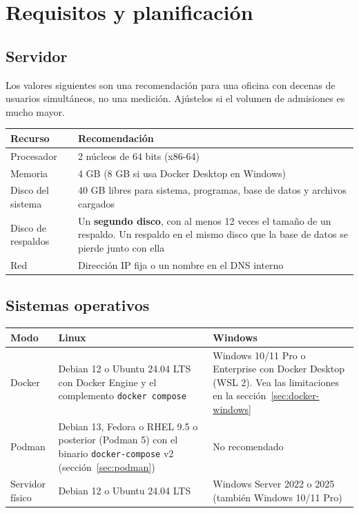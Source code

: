 \chapter{Requisitos y planificación}
\label{cap:requisitos}

\section{Servidor}

Los valores siguientes son una recomendación para una oficina con decenas de usuarios
simultáneos, no una medición. Ajústelos si el volumen de admisiones es mucho mayor.

\begin{xltabular}{\linewidth}{@{}l L@{}}
	\toprule
	\textbf{Recurso} & \textbf{Recomendación} \\
	\midrule
	\endhead
	Procesador & 2 núcleos de 64 bits (x86-64) \\
	Memoria & 4 GB (8 GB si usa Docker Desktop en Windows) \\
	Disco del sistema & 40 GB libres para sistema, programas, base de datos y archivos
	cargados \\
	Disco de respaldos & Un \textbf{segundo disco}, con al menos 12 veces el tamaño de un
	respaldo. Un respaldo en el mismo disco que la base de datos se pierde junto con ella \\
	Red & Dirección IP fija o un nombre en el DNS interno \\
	\bottomrule
\end{xltabular}

\section{Sistemas operativos}

\begin{xltabular}{\linewidth}{@{}l L L@{}}
	\toprule
	\textbf{Modo} & \textbf{Linux} & \textbf{Windows} \\
	\midrule
	\endhead
	Docker & Debian 12 o Ubuntu 24.04 LTS con Docker Engine y el complemento
	\texttt{docker compose} & Windows 10/11 Pro o Enterprise con Docker Desktop (WSL 2). Vea las
	limitaciones en la sección~\ref{sec:docker-windows} \\
	Podman & Debian 13, Fedora o RHEL 9.5 o posterior (Podman 5) con el binario
	\texttt{docker-compose} v2 (sección~\ref{sec:podman}) & No recomendado \\
	Servidor físico & Debian 12 o Ubuntu 24.04 LTS & Windows Server 2022 o 2025 (también
	Windows 10/11 Pro) \\
	\bottomrule
\end{xltabular}

